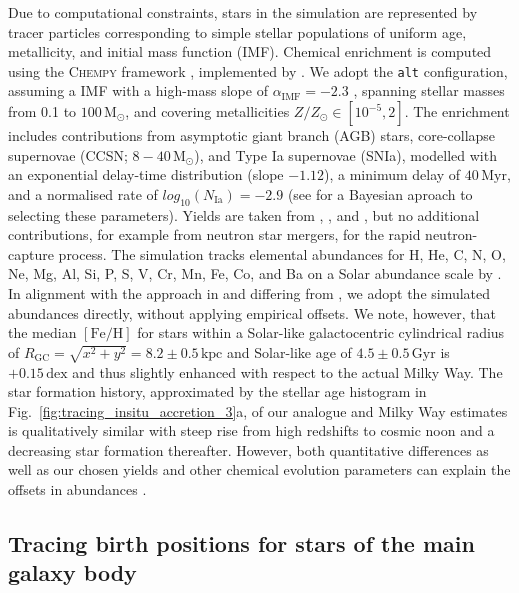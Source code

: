 \documentclass[fleqn,usenatbib]{mnras}
\begin{document}
Due to computational constraints, stars in the simulation are represented by tracer particles corresponding to simple stellar populations of uniform age, metallicity, and initial mass function (IMF). Chemical enrichment is computed using the \textsc{Chempy} framework \citep{Rybizki2017}, implemented by \citet{Buck2021}. We adopt the \texttt{alt} configuration, assuming a \citet{Chabrier2003} IMF with a high-mass slope of $\alpha_\text{IMF} = -2.3$ , spanning stellar masses from 0.1 to $100\,\mathrm{M_\odot}$, and covering metallicities $Z/Z_\odot \in [10^{-5},2]$. The enrichment includes contributions from asymptotic giant branch (AGB) stars, core-collapse supernovae (CCSN; $8 - 40\,\mathrm{M_\odot}$), and Type Ia supernovae (SNIa), modelled with an exponential delay-time distribution (slope $-1.12$), a minimum delay of $40\,\mathrm{Myr}$, and a normalised rate of $log_{10}(N_\mathrm{Ia}) = -2.9$ (see \citealt{Buck2025,Guenes2025} for a Bayesian aproach to selecting these parameters). Yields are taken from \citet[][CCSN]{Chieffi2004}, \citet[][SNIa]{Seitenzahl2013}, and \citet[][AGB; \texttt{new\_fid} yields in \citealt{Buck2021}]{Karakas2016}, but no additional contributions, for example from neutron star mergers, for the rapid neutron-capture process. The simulation tracks elemental abundances for H, He, C, N, O, Ne, Mg, Al, Si, P, S, V, Cr, Mn, Fe, Co, and Ba on a Solar abundance scale by \citet{Asplund2009}. In alignment with the approach in \citet{Buder2025} and differing from \citet{Buder2024}, we adopt the simulated abundances directly, without applying empirical offsets. We note, however, that the median $\mathrm{[Fe/H]}$ for stars within a Solar-like galactocentric cylindrical radius of $R_\mathrm{GC} = \sqrt{x^2+y^2} = 8.2 \pm 0.5\,\mathrm{kpc}$ \citep{BlandHawthorn_Gerhard2016} and Solar-like age of $4.5 \pm 0.5\,\mathrm{Gyr}$ \citep{Soderblom2010} is $+0.15\,\mathrm{dex}$ and thus slightly enhanced with respect to the actual Milky Way. The star formation history, approximated by the stellar age histogram in Fig.~\ref{fig:tracing_insitu_accretion_3}a, of our analogue and Milky Way estimates \citep{Snaith2015} is qualitatively similar with steep rise from high redshifts to cosmic noon and a decreasing star formation thereafter. However, both quantitative differences as well as our chosen yields and other chemical evolution parameters can explain the offsets in abundances \citep[see also][]{Buck2021}.

\subsection{Tracing birth positions for stars of the main galaxy body}  \label{sec:data_birth_positions}
\end{document}
